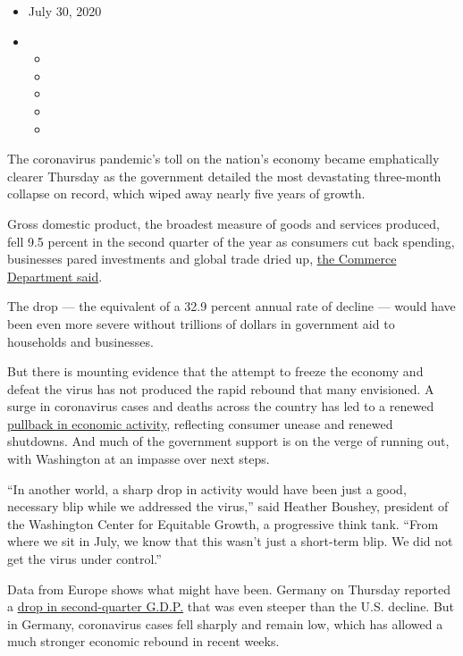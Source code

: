 \begin{itemize}
\item
  July 30, 2020
\item
  \begin{itemize}
  \item
  \item
  \item
  \item
  \item
  \end{itemize}
\end{itemize}

The coronavirus pandemic's toll on the nation's economy became
emphatically clearer Thursday as the government detailed the most
devastating three-month collapse on record, which wiped away nearly five
years of growth.

Gross domestic product, the broadest measure of goods and services
produced, fell 9.5 percent in the second quarter of the year as
consumers cut back spending, businesses pared investments and global
trade dried up,
\href{https://www.bea.gov/sites/default/files/2020-07/gdp2q20_adv.pdf}{the
Commerce Department said}.

The drop --- the equivalent of a 32.9 percent annual rate of decline ---
would have been even more severe without trillions of dollars in
government aid to households and businesses.

But there is mounting evidence that the attempt to freeze the economy
and defeat the virus has not produced the rapid rebound that many
envisioned. A surge in coronavirus cases and deaths across the country
has led to a renewed
\href{https://www.nytimes.com/2020/07/15/business/economy/economic-recovery-coronavirus-resurgence.html?action=click\&module=RelatedLinks\&pgtype=Article}{pullback
in economic activity}, reflecting consumer unease and renewed shutdowns.
And much of the government support is on the verge of running out, with
Washington at an impasse over next steps.

``In another world, a sharp drop in activity would have been just a
good, necessary blip while we addressed the virus,'' said Heather
Boushey, president of the Washington Center for Equitable Growth, a
progressive think tank. ``From where we sit in July, we know that this
wasn't just a short-term blip. We did not get the virus under control.''

Data from Europe shows what might have been. Germany on Thursday
reported a
\href{https://www.nytimes.com/live/2020/07/30/business/stock-market-today-coronavirus/the-german-economy-had-its-biggest-slump-in-50-years}{drop
in second-quarter G.D.P.} that was even steeper than the U.S. decline.
But in Germany, coronavirus cases fell sharply and remain low, which has
allowed a much stronger economic rebound in recent weeks.

